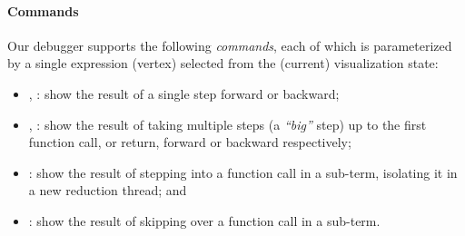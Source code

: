 
\paragraph{Commands}
Our debugger supports the following \emph{commands}, each of which
is parameterized by a single expression (vertex) selected from the
(current) visualization state:
%
\begin{itemize}
%
\item \stepforwardsym, \stepbackwardsym:
      show the result of a single step forward or backward;
%
\item \jumpforwardsym, \jumpbackwardsym:
      show the result of taking multiple steps (a \emph{``big''} step)
      up to the first function call, or return, forward or backward
      respectively;
%
\item \stepintosym:
      show the result of stepping into a function call in a sub-term,
      isolating it in a new reduction thread; and
%
\item \stepoversym:
      show the result of skipping over a function call in a sub-term.
\end{itemize}

